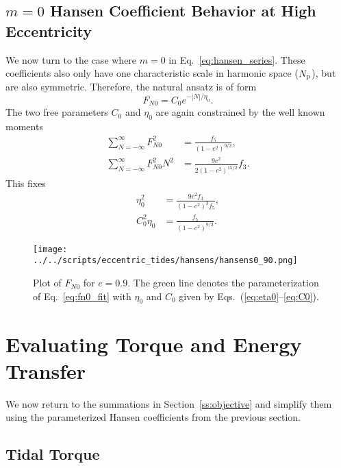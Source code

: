 \documentclass[
        fleqn,
        usenatbib,
    ]{mnras}
\newcommand*{\abs}[1]{\left|#1\right|}
\newcommand*{\p}[1]{\left(#1\right)}
\begin{document}
\subsection{$m = 0$ Hansen Coefficient Behavior at High Eccentricity}

We now turn to the case where $m = 0$ in Eq.~\eqref{eq:hansen_series}. These
coefficients also only have one characteristic scale in harmonic space ($N_{\rm
p}$), but are also symmetric. Therefore, the natural ansatz is of form
\begin{equation}
    F_{N0} = C_0 e^{-\abs{N} / \eta_0}.\label{eq:fn0_fit}
\end{equation}
The two free parameters $C_0$ and $\eta_0$ are again constrained by the well known
moments \citep{hut81}
\begin{align}
    \sum\limits_{N = -\infty}^\infty F_{N0}^2 &= \frac{f_5}{\p{1 - e^2}^{9/2}}
        ,\\
    \sum\limits_{N = -\infty}^\infty F_{N0}^2 N^2
        &= \frac{9e^2}{2\p{1 - e^2}^{15/2}}
            f_3.
\end{align}
This fixes
\begin{align}
    \eta_0^2 &= \frac{9e^2f_3}{\p{1 - e^2}^{3}f_5},\label{eq:eta0}\\
    C_0^2\eta_0 &= \frac{f_5}{\p{1 - e^2}^{9/2}}.\label{eq:C0}
\end{align}

\begin{figure}
    \centering
    \texttt{[image: ../../scripts/eccentric\_tides/hansens/hansens0\_90.png]}
    \caption{Plot of $F_{N0}$ for $e = 0.9$. The green line denotes the
    parameterization of Eq.~\eqref{eq:fn0_fit} with $\eta_0$ and $C_0$ given by
    Eqs.~(\ref{eq:eta0}--\ref{eq:C0}).}\label{fig:fn0_fit}
\end{figure}

\section{Evaluating Torque and Energy Transfer}\label{s:eval}

We now return to the summations in Section~\ref{ss:objective} and simplify them
using the parameterized Hansen coefficients from the previous section.

\subsection{Tidal Torque}
\end{document}
